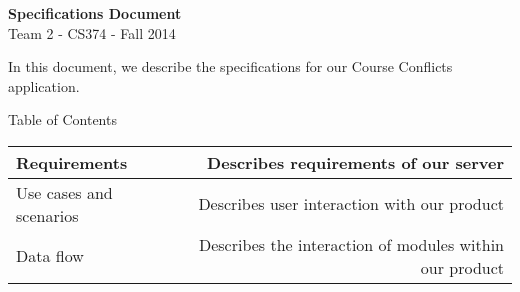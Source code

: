 \documentclass[11pt]{article}
\begin{document}
\begin{center}
\LARGE{\textbf{Specifications Document}}\\
\normalsize{Team 2 - CS374 - Fall 2014}
\end{center}
\vspace{.1in}

In this document, we describe the specifications for our Course Conflicts application.
\vspace{.2in}

\LARGE Table of Contents \\

\normalsize
\begin{tabular}{l || r}
  \hline
  Requirements & Describes requirements of our server \\ \hline
  Use cases and scenarios & Describes user interaction with our product \\ \hline
  Data flow & Describes the interaction of modules within our product \\
  \hline
\end{tabular}
\end{document}
